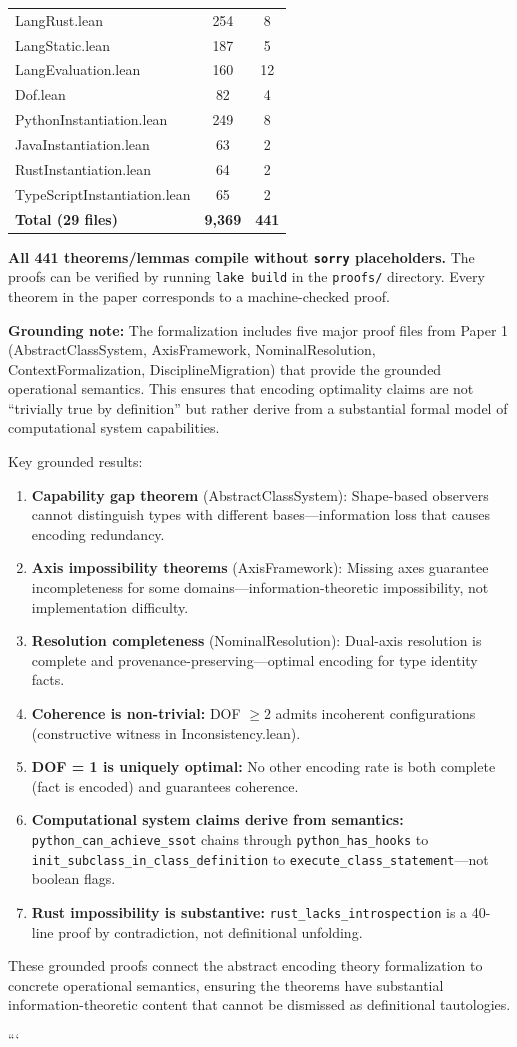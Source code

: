 \begin{center}
\begin{tabular}{lcc}
LangRust.lean & 254 & 8 \\
LangStatic.lean & 187 & 5 \\
LangEvaluation.lean & 160 & 12 \\
Dof.lean & 82 & 4 \\
PythonInstantiation.lean & 249 & 8 \\
JavaInstantiation.lean & 63 & 2 \\
RustInstantiation.lean & 64 & 2 \\
TypeScriptInstantiation.lean & 65 & 2 \\
\midrule
\textbf{Total (29 files)} & \textbf{9,369} & \textbf{441} \\
\bottomrule
\end{tabular}
\end{center}

\textbf{All 441 theorems/lemmas compile without \texttt{sorry} placeholders.} The proofs can be verified by running \texttt{lake build} in the \texttt{proofs/} directory. Every theorem in the paper corresponds to a machine-checked proof.

\textbf{Grounding note:} The formalization includes five major proof files from Paper 1 (AbstractClassSystem, AxisFramework, NominalResolution, ContextFormalization, DisciplineMigration) that provide the grounded operational semantics. This ensures that encoding optimality claims are not ``trivially true by definition'' but rather derive from a substantial formal model of computational system capabilities.

Key grounded results:
\begin{enumerate}
\item \textbf{Capability gap theorem} (AbstractClassSystem): Shape-based observers cannot distinguish types with different bases---information loss that causes encoding redundancy.
\item \textbf{Axis impossibility theorems} (AxisFramework): Missing axes guarantee incompleteness for some domains---information-theoretic impossibility, not implementation difficulty.
\item \textbf{Resolution completeness} (NominalResolution): Dual-axis resolution is complete and provenance-preserving---optimal encoding for type identity facts.
\item \textbf{Coherence is non-trivial:} DOF $\geq 2$ admits incoherent configurations (constructive witness in Inconsistency.lean).
\item \textbf{DOF = 1 is uniquely optimal:} No other encoding rate is both complete (fact is encoded) and guarantees coherence.
\item \textbf{Computational system claims derive from semantics:} \texttt{python\_can\_achieve\_ssot} chains through \texttt{python\_has\_hooks} to \texttt{init\_subclass\_in\_class\_definition} to \texttt{execute\_class\_statement}---not boolean flags.
\item \textbf{Rust impossibility is substantive:} \texttt{rust\_lacks\_introspection} is a 40-line proof by contradiction, not definitional unfolding.
\end{enumerate}

These grounded proofs connect the abstract encoding theory formalization to concrete operational semantics, ensuring the theorems have substantial information-theoretic content that cannot be dismissed as definitional tautologies.

```
